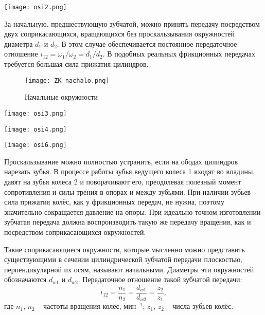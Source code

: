 \begin{marginfigure}
	\texttt{[image: osi2.png]}
\end{marginfigure}

За начальную, предшествующую зубчатой, можно принять передачу посредством двух соприкасающихся, вращающихся без проскальзывания окружностей диаметра $ d_1 $ и $ d_2 $.
В этом случае обеспечивается постоянное передаточное отношение $ i_{12}=\omega_1 / \omega_2 = d_1 / d_2 $. 
В подобных реальных фрикционных передачах требуется большая сила прижатия цилиндров.

\begin{figure*}[h!]
	\texttt{[image: ZK\_nachalo.png]}
	\caption{Начальные окружности}
	\label{pic:ZK_nachalo}
\end{figure*}

\begin{marginfigure}
	\texttt{[image: osi3.png]}
\end{marginfigure}

\begin{marginfigure}
	\texttt{[image: osi4.png]}
\end{marginfigure}

\begin{marginfigure}
	\texttt{[image: osi6.png]}
\end{marginfigure}

Проскальзывание можно полностью устранить, если на ободах цилиндров нарезать зубья.
В процессе работы зубья ведущего колеса \textsc{1} входят во впадины, давят на зубья колеса 2 и поворачивают его, преодолевая полезный момент сопротивления и силы трения в опорах и между зубьями.
При наличии зубьев сила прижатия колёс, как у фрикционных передач, не нужна, поэтому значительно сокращается давление на опоры.
При идеально точном изготовлении зубчатая передача должна воспроизводить такую же передачу вращения, как и посредством соприкасающихся окружностей.

Такие соприкасающиеся окружности, которые мысленно можно представить существующими в сечении цилиндрической зубчатой передачи плоскостью, перпендикулярной их осям, называют начальными.
Диаметры эти окружностей обозначаются $ d_{w1} $ и $ d_{w2} $.
Передаточное отношение такой зубчатой передачи:
\begin{equation*}
i_{12} = \dfrac{n_1}{n_2} = \dfrac{d_{w1}}{d_{w2}} = \dfrac{z_2}{z_1},
\end{equation*}
\noindent
где $ n_1,\,n_2 $ -- частоты вращения колёс, $ \text{мин}^{-1} $; $ z_1,\,z_2 $ -- числа зубьев колёс.

